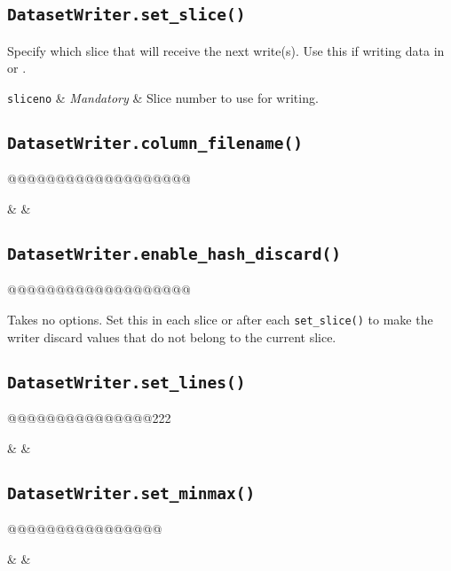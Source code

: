 \subsection{\texttt{DatasetWriter.set\_slice()}}
Specify which slice that will receive the next write(s).  Use this if
writing data in \prepare or \synthesis.
\begin{leftbar}
\starttable
\texttt{sliceno} & \textsl{Mandatory} & Slice number to use for writing.\\
\stoptable
\end{leftbar}


\subsection{\texttt{DatasetWriter.column\_filename()}}
@@@@@@@@@@@@@@@@@@@
\begin{leftbar}
\starttable
\texttt{} & \texttt{} & \\
\stoptable
\end{leftbar}


\subsection{\texttt{DatasetWriter.enable\_hash\_discard()}}
@@@@@@@@@@@@@@@@@@@
\begin{leftbar}
Takes no options.  Set this in each slice or after
each \texttt{set\_slice()} to make the writer discard values that do
not belong to the current slice.
\end{leftbar}


\subsection{\texttt{DatasetWriter.set\_lines()}}
@@@@@@@@@@@@@@@222
\begin{leftbar}
\starttable
\texttt{} & \texttt{} & \\
\stoptable
\end{leftbar}


\subsection{\texttt{DatasetWriter.set\_minmax()}}
@@@@@@@@@@@@@@@@
\begin{leftbar}
\starttable
\texttt{} & \texttt{} & \\
\stoptable
\end{leftbar}




